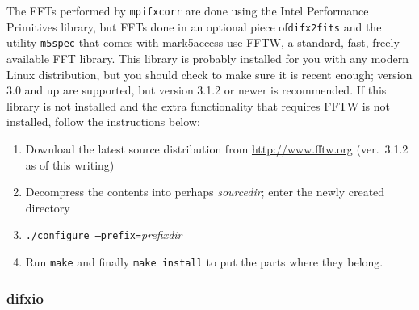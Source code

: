 The FFTs performed by {\tt mpifxcorr} are done using the Intel Performance Primitives library, but FFTs done in an optional piece of{\tt difx2fits} and the utility {\tt m5spec} that comes with mark5access use FFTW, a standard, fast, freely available FFT library.
This library is probably installed for you with any modern Linux distribution, but you should check to make sure it is recent enough; version 3.0 and up are supported, but version 3.1.2 or newer is recommended.
If this library is not installed and the extra functionality that requires FFTW is not installed, follow the instructions below:
\begin{enumerate}
\item Download the latest source distribution from \url{http://www.fftw.org} (ver.\ 3.1.2 as of this writing)
\item Decompress the contents into perhaps {\em sourcedir}; enter the newly created directory
\item {\tt ./configure --prefix=}{\em prefixdir}
\item Run {\tt make} and finally {\tt make install} to put the parts where they belong.
\end{enumerate}









\subsubsection{difxio} \label{sec:difxio}

